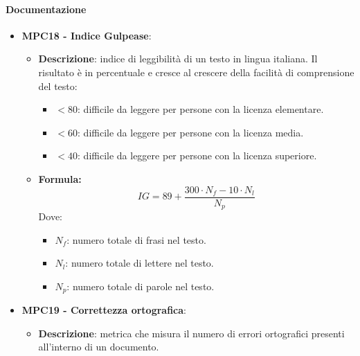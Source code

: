 \documentclass[10pt]{article}
\begin{document}
\begin{justify}
\paragraph{Documentazione}
\begin{itemize}
    \item \textbf{MPC18 - Indice Gulpease}:
    \begin{itemize}
        \item \textbf{Descrizione}: indice di leggibilità di un testo in lingua italiana. Il risultato è in percentuale e cresce al crescere della facilità di comprensione del testo:
            \begin{itemize}
                \item $< 80$: difficile da leggere per persone con la licenza elementare.
                \item $< 60$: difficile da leggere per persone con la licenza media.
                \item $< 40$: difficile da leggere per persone con la licenza superiore.
            \end{itemize}
        \item \textbf{Formula:}
        \[
        IG = 89 + \frac{300 \cdot N_f - 10 \cdot N_l}{N_p}
        \]
        Dove:
        \begin{itemize}
            \item $N_f$: numero totale di frasi nel testo.
            \item $N_l$: numero totale di lettere nel testo.
            \item $N_p$: numero totale di parole nel testo.
        \end{itemize}
    \end{itemize}

    \item \textbf{MPC19 - Correttezza ortografica}:
    \begin{itemize}
        \item \textbf{Descrizione}: metrica che misura il numero di errori ortografici presenti all'interno di un documento.
    \end{itemize}
\end{itemize}


\end{justify}
\end{document}
